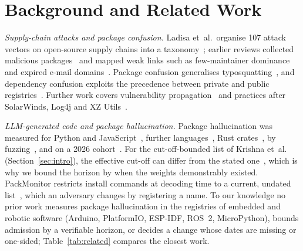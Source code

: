 \documentclass[conference]{IEEEtran}
\begin{document}
\section{Background and Related Work}
\label{sec:related}

\emph{Supply-chain attacks and package confusion.} Ladisa et~al.\ organise 107 attack vectors on open-source supply
chains into a taxonomy~\cite{ladisa2023sok}; earlier reviews collected malicious packages~\cite{ohm2020backstabber} and
mapped weak links such as few-maintainer dominance and expired e-mail domains~\cite{zimmermann2019small,zahan2022weak}.
Package confusion generalises typosquatting~\cite{neupane2023beyond}, and dependency confusion exploits the precedence
between private and public registries~\cite{birsan2021}. Further work covers vulnerability
propagation~\cite{shen2025understanding} and practices after SolarWinds, Log4j and XZ
Utils~\cite{williams2025research,hamer2026closing}.

\emph{LLM-generated code and package hallucination.} Package hallucination was measured for Python and
JavaScript~\cite{spracklen2025package}, further languages~\cite{krishna2025phantoms,lanyado2024}, Rust
crates~\cite{zheng2026crates}, by fuzzing~\cite{zhao2025hfuzzer}, and on a 2026 cohort~\cite{churilov2026range}.
For the cut-off-bounded list of Krishna et~al.~\cite[\S4.6]{krishna2025phantoms} (Section~\ref{sec:intro}), the
effective cut-off can differ from the stated one~\cite{cheng2024dated}, which is why we bound the horizon by when the
weights demonstrably existed. PackMonitor
restricts install commands at decoding time to a current, undated list~\cite{liu2026packmonitor}, which an adversary
changes by registering a name. To our knowledge no prior work measures package hallucination in the registries of
embedded and robotic software (Arduino, PlatformIO, ESP-IDF, ROS~2, MicroPython), bounds admission by a verifiable
horizon, or decides a change whose dates are missing or one-sided; Table~\ref{tab:related} compares the closest work.
\end{document}
